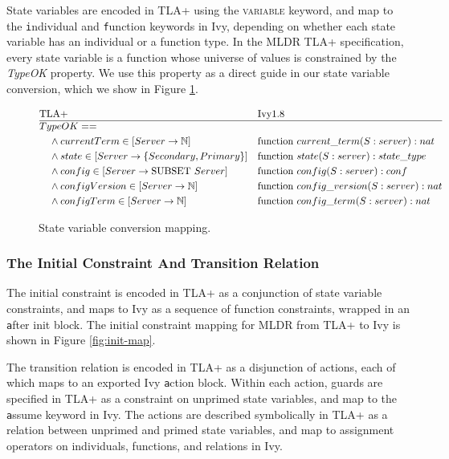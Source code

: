 \documentclass[runningheads]{llncs}
\newcommand{\tla}[1]{{\small\scshape #1}}
\newcommand{\ivy}[1]{{\texttt #1}}
\begin{document}
State variables are encoded in TLA+ using the \tla{variable} keyword, and map to the \ivy{individual} and \ivy{function} keywords in Ivy, depending on whether each state variable has an individual or a function type.  In the MLDR TLA+ specification, every state variable is a function whose universe of values is constrained by the \textit{TypeOK} property.  We use this property as a direct guide in our state variable conversion, which we show in Figure \ref{fig:statevar-map}.

\begin{figure}
  \begin{align*}
    &\text{TLA+} && \text{Ivy} 1.8\\
    \hline
    &TypeOK ==&&\\
      &\quad\land currentTerm \in [Server \to \mathbb{N}]& &\text{function } current\_term(S:server) : nat\\
      &\quad\land state \in [Server \to \{Secondary, Primary\}]& &\text{function } state(S:server) : state\_type\\
      &\quad\land config \in [Server \to \text{SUBSET } Server]& &\text{function } config(S:server) : conf\\
      &\quad\land configVersion \in [Server \to \mathbb{N}]& &\text{function } config\_version(S:server) : nat\\
      &\quad\land configTerm \in [Server \to \mathbb{N}]& &\text{function } config\_term(S:server) : nat\\
  \end{align*}
  \caption{State variable conversion mapping.}
  \label{fig:statevar-map}
\end{figure}

\subsubsection{The Initial Constraint And Transition Relation}

The initial constraint is encoded in TLA+ as a conjunction of state variable constraints, and maps to Ivy as a sequence of function constraints, wrapped in an \ivy{after init} block.    The initial constraint mapping for MLDR from TLA+ to Ivy is shown in Figure \ref{fig:init-map}.

The transition relation is encoded in TLA+ as a disjunction of actions, each of which maps to an exported Ivy \ivy{action} block.  Within each action, guards are specified in TLA+ as a constraint on unprimed state variables, and map to the \ivy{assume} keyword in Ivy.  The actions are described symbolically in TLA+ as a relation between unprimed and primed state variables, and map to assignment operators on individuals, functions, and relations in Ivy.
\end{document}
